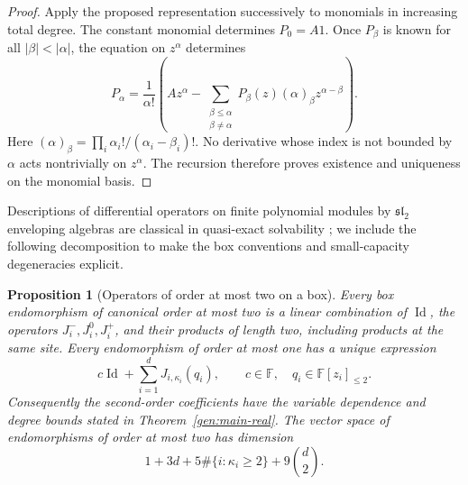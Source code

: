 \documentclass[reqno]{amsart}
\newtheorem{proposition}[theorem]{Proposition}
\theoremstyle{definition}
\theoremstyle{remark}
\DeclareMathOperator{\Id}{Id}
\begin{document}
\begin{proof}
Apply the proposed representation successively to monomials in increasing
total degree.  The constant monomial determines \(P_0=A1\).
Once \(P_\beta\) is known for all \(|\beta|<|\alpha|\), the equation on
\(z^\alpha\) determines
\[
 P_\alpha
 =\frac1{\alpha!}
 \left(Az^\alpha-
 \sum_{\substack{\beta\leq\alpha\\\beta\neq\alpha}}
 P_\beta(z)(\alpha)_\beta z^{\alpha-\beta}\right).
\]
Here \((\alpha)_\beta=\prod_i\alpha_i!/(\alpha_i-\beta_i)!\).
No derivative whose index is not bounded by \(\alpha\) acts nontrivially on
\(z^\alpha\).  The recursion therefore proves existence and uniqueness
on the monomial basis.
\end{proof}

Descriptions of differential operators on finite polynomial modules by
$\mathfrak{sl}_2$ enveloping algebras are classical in quasi-exact
solvability \cite{Turbiner92,Turbiner94}; we include the following
decomposition to make the box conventions and small-capacity degeneracies
explicit.

\begin{proposition}[Operators of order at most two on a box]
\label{gen:box-decomposition}
Every box endomorphism of canonical order at most two is a linear
combination of \(\Id\), the operators \(J_i^-,J_i^0,J_i^+\), and their
products of length two, including products at the same site.
Every endomorphism of order at most one has a unique expression
\begin{equation}
 c\Id+\sum_{i=1}^dJ_{i,\kappa_i}(q_i),
 \qquad c\in\mathbb F,\quad q_i\in\mathbb F[z_i]_{\leq2}.
 \label{gen:eq-first-order}
\end{equation}
Consequently the second-order coefficients have the variable dependence
and degree bounds stated in Theorem~\ref{gen:main-real}.  The vector space
of endomorphisms of order at most two has dimension
\begin{equation}
 1+3d+5\#\{i:\kappa_i\geq2\}+9\binom d2.
 \label{gen:eq-order-two-dimension}
\end{equation}
\end{proposition}
\end{document}
